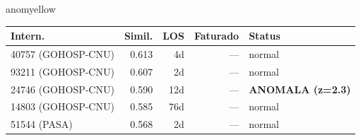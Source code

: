 \documentclass[a4paper,10pt]{article}
\begin{document}
\begin{anomalycard}[Internacao 182811 | PASA | MODERADO (z=2.23)]{anomyellow}
\begin{tabular}{l r r r l}\toprule\textbf{Intern.} & \textbf{Simil.} & \textbf{LOS} & \textbf{Faturado} & \textbf{Status} \\\midrule
40757 (GOHOSP-CNU) & 0.613 & 4d & --- & \textcolor{jcubeblue}{normal} \\
93211 (GOHOSP-CNU) & 0.607 & 2d & --- & \textcolor{jcubeblue}{normal} \\
24746 (GOHOSP-CNU) & 0.590 & 12d & --- & \textcolor{anomred}{\textbf{ANOMALA (z=2.3)}} \\
14803 (GOHOSP-CNU) & 0.585 & 76d & --- & \textcolor{jcubeblue}{normal} \\
51544 (PASA) & 0.568 & 2d & --- & \textcolor{jcubeblue}{normal} \\
\bottomrule\end{tabular}


\end{anomalycard}

\newpage
\end{document}
